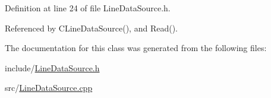 Definition at line 24 of file Line\+Data\+Source.\+h.



Referenced by C\+Line\+Data\+Source(), and Read().



The documentation for this class was generated from the following files\+:\begin{DoxyCompactItemize}
\item 
include/\hyperlink{LineDataSource_8h}{Line\+Data\+Source.\+h}\item 
src/\hyperlink{LineDataSource_8cpp}{Line\+Data\+Source.\+cpp}\end{DoxyCompactItemize}

